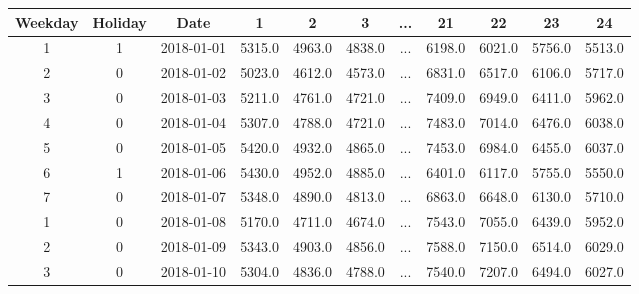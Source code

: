 \begin{table}[h!]
\centering
\begin{tabular}{|c|c|c|c|c|c|c|c|c|c|c|}
\hline
\textbf{Weekday} & \textbf{Holiday} & \textbf{Date} & \textbf{1} & \textbf{2} & \textbf{3} & \textbf{...} & \textbf{21} & \textbf{22} & \textbf{23} & \textbf{24} \\ \hline
1                & 1                & 2018-01-01    & 5315.0     & 4963.0     & 4838.0     & ...          & 6198.0      & 6021.0      & 5756.0      & 5513.0      \\ \hline
2                & 0                & 2018-01-02    & 5023.0     & 4612.0     & 4573.0     & ...          & 6831.0      & 6517.0      & 6106.0      & 5717.0      \\ \hline
3                & 0                & 2018-01-03    & 5211.0     & 4761.0     & 4721.0     & ...          & 7409.0      & 6949.0      & 6411.0      & 5962.0      \\ \hline
4                & 0                & 2018-01-04    & 5307.0     & 4788.0     & 4721.0     & ...          & 7483.0      & 7014.0      & 6476.0      & 6038.0      \\ \hline
5                & 0                & 2018-01-05    & 5420.0     & 4932.0     & 4865.0     & ...          & 7453.0      & 6984.0      & 6455.0      & 6037.0      \\ \hline
6                & 1                & 2018-01-06    & 5430.0     & 4952.0     & 4885.0     & ...          & 6401.0      & 6117.0      & 5755.0      & 5550.0      \\ \hline
7                & 0                & 2018-01-07    & 5348.0     & 4890.0     & 4813.0     & ...          & 6863.0      & 6648.0      & 6130.0      & 5710.0      \\ \hline
1                & 0                & 2018-01-08    & 5170.0     & 4711.0     & 4674.0     & ...          & 7543.0      & 7055.0      & 6439.0      & 5952.0      \\ \hline
2                & 0                & 2018-01-09    & 5343.0     & 4903.0     & 4856.0     & ...          & 7588.0      & 7150.0      & 6514.0      & 6029.0      \\ \hline
3                & 0                & 2018-01-10    & 5304.0     & 4836.0     & 4788.0     & ...          & 7540.0      & 7207.0      & 6494.0      & 6027.0      \\ \hline
\end{tabular}
\end{table}

